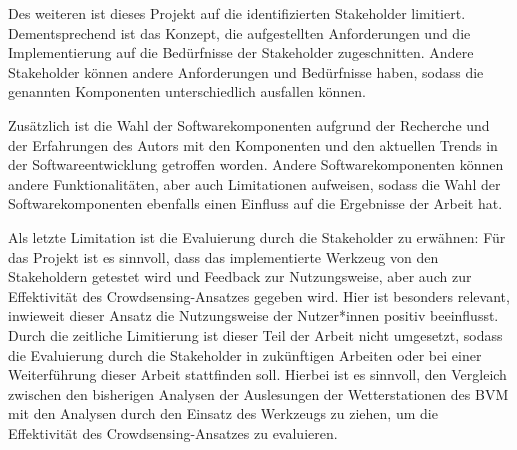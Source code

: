Des weiteren ist dieses Projekt auf die identifizierten Stakeholder limitiert. Dementsprechend ist das Konzept, die aufgestellten Anforderungen und die Implementierung auf die Bedürfnisse der Stakeholder zugeschnitten. Andere Stakeholder können andere Anforderungen und Bedürfnisse haben, sodass die genannten Komponenten unterschiedlich ausfallen können. 

Zusätzlich ist die Wahl der Softwarekomponenten aufgrund der Recherche und der Erfahrungen des Autors mit den Komponenten und den aktuellen Trends in der Softwareentwicklung getroffen worden. Andere Softwarekomponenten können andere Funktionalitäten, aber auch Limitationen aufweisen, sodass die Wahl der Softwarekomponenten ebenfalls einen Einfluss auf die Ergebnisse der Arbeit hat.

Als letzte Limitation ist die Evaluierung durch die Stakeholder zu erwähnen: Für das Projekt ist es sinnvoll, dass das implementierte Werkzeug von den Stakeholdern getestet wird und Feedback zur Nutzungsweise, aber auch zur Effektivität des Crowdsensing-Ansatzes gegeben wird. Hier ist besonders relevant, inwieweit dieser Ansatz die Nutzungsweise der Nutzer*innen positiv beeinflusst. Durch die zeitliche Limitierung ist dieser Teil der Arbeit nicht umgesetzt, sodass die Evaluierung durch die Stakeholder in zukünftigen Arbeiten oder bei einer Weiterführung dieser Arbeit stattfinden soll. Hierbei ist es sinnvoll, den Vergleich zwischen den bisherigen Analysen der Auslesungen der Wetterstationen des \ac{BVM} mit den Analysen durch den Einsatz des Werkzeugs zu ziehen, um die Effektivität des Crowdsensing-Ansatzes zu evaluieren.


